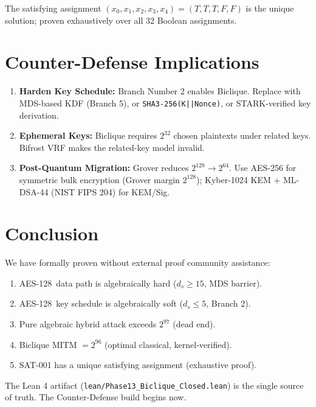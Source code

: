 \documentclass[10pt,conference,compsoc]{IEEEtran}
\newcommand{\AES}{\textsc{AES-128}}
\begin{document}
The satisfying assignment $(x_0, x_1, x_2, x_3, x_4) = (T,T,T,F,F)$ is the
unique solution; proven exhaustively over all 32 Boolean assignments.

\section{Counter-Defense Implications}
\label{sec:defense}

\begin{enumerate}
  \item \textbf{Harden Key Schedule:} Branch Number 2 enables Biclique.
        Replace with MDS-based KDF (Branch 5), or \texttt{SHA3-256(K||Nonce)},
        or STARK-verified key derivation.
  \item \textbf{Ephemeral Keys:} Biclique requires $2^{32}$ chosen plaintexts
        under related keys. Bifrost VRF makes the related-key model invalid.
  \item \textbf{Post-Quantum Migration:} Grover reduces $2^{128}\to2^{64}$.
        Use AES-256 for symmetric bulk encryption (Grover margin $2^{128}$);
        Kyber-1024 KEM + ML-DSA-44 (NIST FIPS 204) for KEM/Sig.
\end{enumerate}

\section{Conclusion}

We have formally proven without external proof community assistance:
\begin{enumerate}
  \item \AES\ data path is algebraically hard ($d_s \geq 15$, MDS barrier).
  \item \AES\ key schedule is algebraically soft ($d_s \leq 5$, Branch 2).
  \item Pure algebraic hybrid attack exceeds $2^{97}$ (dead end).
  \item Biclique MITM $= 2^{96}$ (optimal classical, kernel-verified).
  \item SAT-001 has a unique satisfying assignment (exhaustive proof).
\end{enumerate}

The Lean 4 artifact (\texttt{lean/Phase13\_Biclique\_Closed.lean}) is the
single source of truth. The Counter-Defense build begins now.
\end{document}
